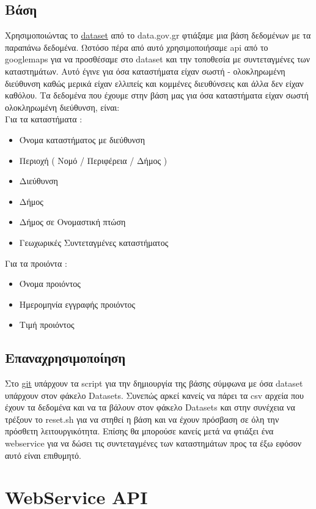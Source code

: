 \documentclass[a4paper,10pt]{report}
\begin{document}
\subsection{Βάση}
Χρησιμοποιώντας το \href{http://www.data.gov.gr/dataset/17/}{dataset} από το data.gov.gr 
φτιάξαμε μια βάση δεδομένων με τα παραπάνω δεδομένα. Ωστόσο πέρα από αυτό χρησιμοποιήσαμε
api από το googlemaps για να προσθέσαμε στο dataset και την τοποθεσία με συντεταγμένες των 
καταστημάτων. Αυτό έγινε για όσα καταστήματα είχαν σωστή - ολοκληρωμένη διεύθυνση καθώς
μερικά είχαν ελλιπείς και κομμένες διευθύνσεις και άλλα δεν είχαν καθόλου. 
Τα δεδομένα που έχουμε στην βάση μας για όσα καταστήματα είχαν σωστή 
ολοκληρωμένη διεύθυνση, είναι: \\
Για τα καταστήματα :
\begin{itemize}
 \item Όνομα καταστήματος με διεύθυνση
 \item Περιοχή ( Νομό / Περιφέρεια / Δήμος )
 \item Διεύθυνση 
 \item Δήμος 
 \item Δήμος σε Ονομαστική πτώση
 \item Γεωχωρικές Συντεταγμένες καταστήματος
\end{itemize}
\newpage
Για τα προιόντα :
\begin{itemize}
 \item Όνομα προιόντος
 \item Ημερομηνία εγγραφής προιόντος 
 \item Τιμή προιόντος
\end{itemize}


\subsection{Επαναχρησιμοποίηση}
Στο \href{https://github.com/Pana-sonic/aginara/tree/master/Database}{git} υπάρχουν τα script 
για την δημιουργία της βάσης σύμφωνα με όσα dataset υπάρχουν στον φάκελο Datasets. Συνεπώς αρκεί
κανείς να πάρει τα csv αρχεία που έχουν τα δεδομένα και να τα βάλουν στον φάκελο Datasets και στην
συνέχεια να τρέξουν το reset.sh για να στηθεί η βάση και να έχουν πρόσβαση σε όλη την πρόσθετη
λειτουργικότητα. Επίσης θα μπορούσε κανείς μετά να φτιάξει ένα webservice για να δώσει τις 
συντεταγμένες των καταστημάτων προς τα έξω εφόσον αυτό είναι επιθυμητό.

\section{WebService API}
\end{document}
